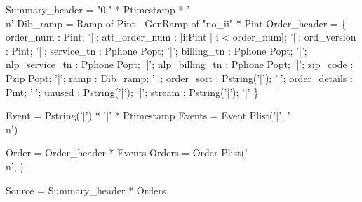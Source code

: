\begin{code}
 Summary\_header = "0|" * Ptimestamp * '\\n'
\mbox{}
 Dib\_ramp = 
  Ramp of Pint 
| GenRamp of "no\_ii" * Pint
\mbox{}
 Order\_header = \{ 
     order\_num : Pint;  
'|'; att\_order\_num : [i:Pint | i < order\_num];  
'|'; ord\_version : Pint;  
'|'; service\_tn : Pphone Popt;
'|'; billing\_tn : Pphone Popt;  
'|'; nlp\_service\_tn : Pphone Popt;  
'|'; nlp\_billing\_tn : Pphone Popt;  
'|'; zip\_code : Pzip Popt;  
'|'; ramp : Dib\_ramp;  
'|'; order\_sort : Pstring('|');  
'|'; order\_details : Pint;
'|'; unused : Pstring('|');  
'|'; stream : Pstring('|'); 
'|'
\} 

 Event  = Pstring('|') * '|' * Ptimestamp
 Events = Event Plist('|', '\\n')

 Order  = Order\_header * Events
 Orders = Order Plist('\\n', )

 Source = Summary\_header * Orders\end{code}

